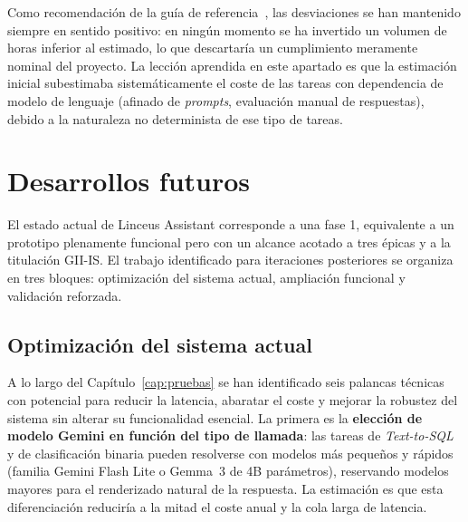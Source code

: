 Como recomendación de la guía de referencia~\cite{segura2024guiatfg}, las desviaciones se han mantenido siempre en sentido positivo: en ningún momento se ha invertido un volumen de horas inferior al estimado, lo que descartaría un cumplimiento meramente nominal del proyecto. La lección aprendida en este apartado es que la estimación inicial subestimaba sistemáticamente el coste de las tareas con dependencia de modelo de lenguaje (afinado de \textit{prompts}, evaluación manual de respuestas), debido a la naturaleza no determinista de ese tipo de tareas.

\section{Desarrollos futuros}\label{sec:conc-futuros}

El estado actual de Linceus Assistant corresponde a una fase 1, equivalente a un prototipo plenamente funcional pero con un alcance acotado a tres épicas y a la titulación GII-IS. El trabajo identificado para iteraciones posteriores se organiza en tres bloques: optimización del sistema actual, ampliación funcional y validación reforzada.

\subsection{Optimización del sistema actual}\label{subsec:conc-fut-optimizacion}

A lo largo del Capítulo~\ref{cap:pruebas} se han identificado seis palancas técnicas con potencial para reducir la latencia, abaratar el coste y mejorar la robustez del sistema sin alterar su funcionalidad esencial. La primera es la \textbf{elección de modelo Gemini en función del tipo de llamada}: las tareas de \textit{Text-to-SQL} y de clasificación binaria pueden resolverse con modelos más pequeños y rápidos (familia Gemini Flash Lite o Gemma~3 de 4B parámetros), reservando modelos mayores para el renderizado natural de la respuesta. La estimación es que esta diferenciación reduciría a la mitad el coste anual y la cola larga de latencia.

